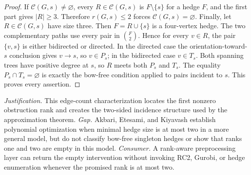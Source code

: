 \documentclass{article}
\begin{document}
\begin{proof}
If \(\mathcal C(G,s)\neq\varnothing\), every
\(R\in\mathcal C(G,s)\) is \(F\setminus\{s\}\) for a hedge \(F\), and the
first part gives \(|R|\geq3\).  Therefore \(r(G,s)\leq2\) forces
\(\mathcal C(G,s)=\varnothing\).  Finally, let
\(R\in\mathcal C(G,s)\) have size three.  Then
\(F=R\cup\{s\}\) is a four-vertex hedge.  The two complementary paths use
every pair in \(\binom F2\).  Hence for every \(v\in R\), the pair
\(\{v,s\}\) is either bidirected or directed.  In the directed case the
orientation-toward-\(s\) conclusion gives \(v\to s\), so
\(v\in P_s\); in the bidirected case \(v\in T_s\).  Both spanning trees
have positive degree at \(s\), so \(R\) meets both \(P_s\) and \(T_s\).
The equality \(P_s\cap T_s=\varnothing\) is exactly the bow-free condition
applied to pairs incident to \(s\).  This proves every assertion.
\end{proof}
\par\smallskip\noindent \textit{Justification.} This edge-count characterization locates the first nonzero obstruction rank and creates the two-sided incidence structure used by the approximation theorem. \textit{Gap.} Akbari, Etesami, and Kiyavash establish polynomial optimization when minimal hedge size is at most two in a more general model, but do not classify bow-free singleton hedges or show that ranks one and two are empty in this model. \textit{Consumer.} A rank-aware preprocessing layer can return the empty intervention without invoking RC2, Gurobi, or hedge enumeration whenever the promised rank is at most two.
\end{document}
